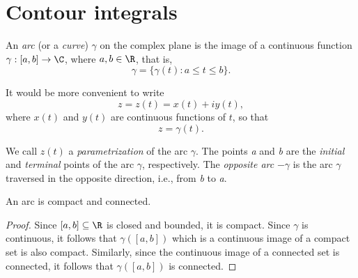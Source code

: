 \section{Contour integrals}

\begin{definition}
    An \emph{arc} (or a \emph{curve}) \(\gamma\) on the complex plane is the image of a continuous function \(\gamma : [a, b] \to \C\), where \(a, b \in \R\), that is,
    \[
        \gamma = \{\gamma(t) : a \leq t \leq b\}.
    \]
\end{definition}

It would be more convenient to write
\[
    z = z(t) = x(t) + iy(t),
\]
where \(x(t)\) and \(y(t)\) are continuous functions of \(t\), so that
\[
    z = \gamma(t).
\]

We call \(z(t)\) a \emph{parametrization} of the arc \(\gamma\). The points \emph{a} and \emph{b} are the \emph{initial} and \emph{terminal} points of the arc \(\gamma\), respectively. The \emph{opposite arc} \(-\gamma\) is the arc \(\gamma\) traversed in the opposite direction, i.e., from \emph{b} to \emph{a}.

\begin{theorem}
    An arc is compact and connected.
\end{theorem}

\begin{proof}
    Since \([a, b] \subseteq \R\) is closed and bounded, it is compact. Since \(\gamma\) is continuous, it follows that \(\gamma([a, b])\) which is a continuous image of a compact set is also compact. Similarly, since the continuous image of a connected set is connected, it follows that \(\gamma([a, b])\) is connected.
\end{proof}

